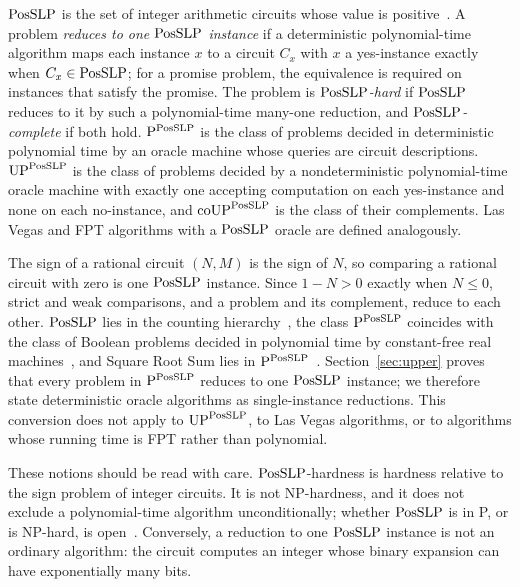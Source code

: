 \begin{definition}
\label{def:models-posslp}
$\mathrm{PosSLP}$ is the set of integer arithmetic circuits whose value is
positive~\cite{AllenderEtAl2009}. A problem \emph{reduces to one $\mathrm{PosSLP}$
instance} if a deterministic polynomial-time algorithm maps each instance $x$
to a circuit $C_x$ with $x$ a yes-instance exactly when $C_x\in\mathrm{PosSLP}$; for a
promise problem, the equivalence is required on instances that satisfy the
promise. The problem is \emph{$\mathrm{PosSLP}$-hard} if $\mathrm{PosSLP}$ reduces to it by
such a polynomial-time many-one reduction, and \emph{$\mathrm{PosSLP}$-complete} if
both hold. $\mathrm P^{\mathrm{PosSLP}}$ is the class of problems decided in
deterministic polynomial time by an oracle machine whose queries are circuit
descriptions. $\mathrm{UP}^{\mathrm{PosSLP}}$ is the class of problems decided by a
nondeterministic polynomial-time oracle machine with exactly one accepting
computation on each yes-instance and none on each no-instance, and
$\mathrm{coUP}^{\mathrm{PosSLP}}$ is the class of their complements. Las Vegas and FPT
algorithms with a $\mathrm{PosSLP}$ oracle are defined analogously.
\end{definition}

The sign of a rational circuit $(N,M)$ is the sign of $N$, so comparing a
rational circuit with zero is one $\mathrm{PosSLP}$ instance. Since $1-N>0$ exactly
when $N\le0$, strict and weak comparisons, and a problem and its complement,
reduce to each other. $\mathrm{PosSLP}$ lies in the counting
hierarchy~\cite[Theorem~1.4]{AllenderEtAl2009}, the class $\mathrm P^{\mathrm{PosSLP}}$
coincides with the class of Boolean problems decided in polynomial time by
constant-free real machines~\cite[Proposition~1.1]{AllenderEtAl2009}, and
Square Root Sum lies in
$\mathrm P^{\mathrm{PosSLP}}$~\cite[Section~1.4]{AllenderEtAl2009}.
Section~\ref{sec:upper} proves
that every problem in $\mathrm P^{\mathrm{PosSLP}}$ reduces to one $\mathrm{PosSLP}$ instance;
we therefore state deterministic oracle algorithms as single-instance
reductions. This conversion does not apply to $\mathrm{UP}^{\mathrm{PosSLP}}$, to Las
Vegas algorithms, or to algorithms whose running time is FPT rather than
polynomial.

These notions should be read with care. $\mathrm{PosSLP}$-hardness is hardness
relative to the sign problem of integer circuits. It is not NP-hardness, and
it does not exclude a polynomial-time algorithm unconditionally; whether
$\mathrm{PosSLP}$ is in P, or is NP-hard, is open~\cite{BuergisserJindal2024}.
Conversely, a reduction to one $\mathrm{PosSLP}$ instance is not an ordinary
algorithm: the circuit computes an integer whose binary expansion can have
exponentially many bits.

